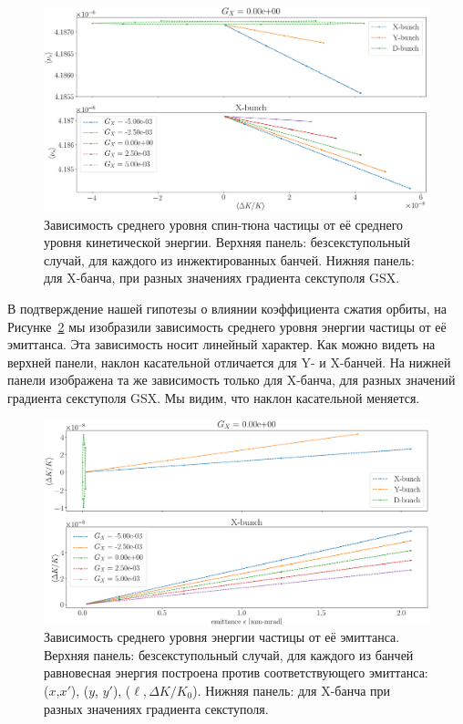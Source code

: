 \begin{figure}[h]
	\centering
	\includegraphics[height=.3\paperheight]{images/stune_traj_equ/stune_vs_equ_energy}
	\caption[Зависимость среднего уровня спин-тюна частицы от её среднего уровня кинетической энергии.]{Зависимость среднего уровня спин-тюна частицы от её среднего уровня кинетической энергии. Верхняя панель: безсекступольный случай, для каждого из инжектированных банчей. Нижняя панель: для X-банча, при разных значениях градиента секступоля GSX.\label{fig:stune_traj_equ_main}}
\end{figure}

В подтверждение нашей гипотезы о влиянии коэффициента сжатия орбиты, на Рисунке~\ref{fig:stune_traj_equ_second} мы изобразили зависимость среднего уровня энергии частицы от её эмиттанса. Эта зависимость носит линейный характер. Как можно видеть на верхней панели, наклон касательной отличается для Y- и X-банчей. На нижней панели изображена та же зависимость только для X-банча, для разных значений градиента секступоля GSX. Мы видим, что наклон касательной меняется. 

\begin{figure}[h]
	\centering
	\includegraphics[height=.3\paperheight]{images/stune_traj_equ/equ_energy_vs_emittance}
	\caption[Зависимость среднего уровня энергии частицы от её эмиттанса]{Зависимость среднего уровня энергии частицы от её эмиттанса. Верхняя панель: безсекступольный случай, для каждого из банчей равновесная энергия построена против соответствующего эмиттанса: ($x$,$x'$), ($y$, $y'$), ($\ell, \Delta K/K_0$). Нижняя панель: для X-банча при разных значениях градиента секступоля.\label{fig:stune_traj_equ_second}}
\end{figure}

